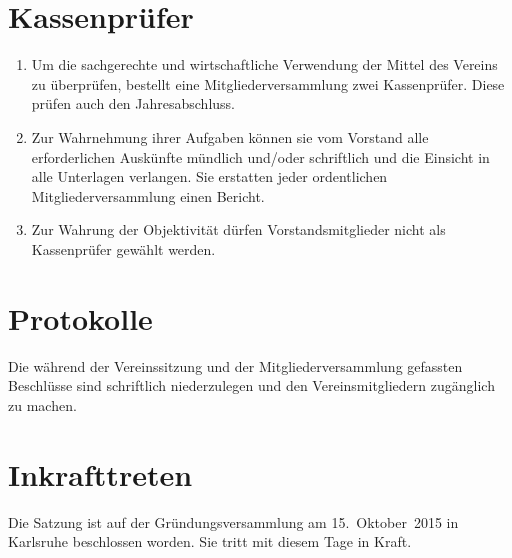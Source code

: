 \documentclass[a4paper]{scrartcl}
\newcommand\Gruendungsdatum{15.~Oktober~2015}
\begin{document}
\section{Kassenprüfer}
\begin{enumerate}
    \item Um die sachgerechte und wirtschaftliche Verwendung der Mittel des
          Vereins zu überprüfen, bestellt eine Mitgliederversammlung zwei
          Kassenprüfer. Diese prüfen auch den Jahresabschluss.
    \item Zur Wahrnehmung ihrer Aufgaben können sie vom Vorstand alle
          erforderlichen Auskünfte mündlich und/oder schriftlich und die
          Einsicht in alle Unterlagen verlangen. Sie erstatten jeder
          ordentlichen Mitgliederversammlung einen Bericht.
    \item Zur Wahrung der Objektivität dürfen Vorstandsmitglieder nicht als
          Kassenprüfer gewählt werden.
\end{enumerate}

\section{Protokolle}
Die während der Vereinssitzung und der Mitgliederversammlung gefassten
Beschlüsse sind schriftlich niederzulegen und den Vereinsmitgliedern
zugänglich zu machen.

\section{Inkrafttreten}
Die Satzung ist auf der Gründungsversammlung am \Gruendungsdatum{} in Karlsruhe
beschlossen worden. Sie tritt mit diesem Tage in Kraft.

\end{document}
